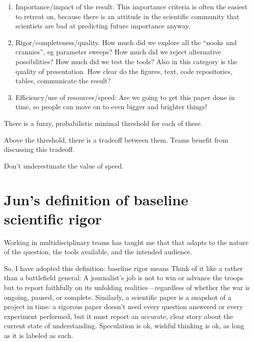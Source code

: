 \documentclass[letterpaper,10pt,english]{sphinxmanual}
\let\sphinxpxdimen\pdfpxdimen\else\newdimen\sphinxpxdimen
\begin{document}
\noindent\sphinxincludegraphics[width=400\sphinxpxdimen]{{fig3way_2}.pdf}
\begin{enumerate}
%
\item {} 
\sphinxAtStartPar
Importance/impact of the result: This importance criteria is often the easiest to retreat on, because there is an attitude in the scientific community that scientists are bad at predicting future importance anyway.

\item {} 
\sphinxAtStartPar
Rigor/completeness/quality. How much did we explore all the “nooks and crannies”, eg parameter sweeps? How much did we reject alternative possibilities? How much did we test the tools? Also in this category is the quality of presentation. How clear do the figures, text, code repositories, tables, communicate the result?

\item {} 
\sphinxAtStartPar
Efficiency/use of resources/speed: Are we going to get this paper done in time, so people can move on to even bigger and brighter things!

\end{enumerate}

\sphinxAtStartPar
There is a fuzzy, probabilistic minimal threshold for each of these.

\sphinxAtStartPar
Above the threshold, there is a trade\sphinxhyphen{}off between them. Teams benefit from discussing this trade\sphinxhyphen{}off.

\sphinxAtStartPar
Don’t underestimate the value of speed.


\section{Jun’s definition of baseline scientific rigor}
\label{\detokenize{02Elements:jun-s-definition-of-baseline-scientific-rigor}}
\sphinxAtStartPar
Working in multidisciplinary teams has taught me that  that adapts to the nature of the question, the tools available, and the intended audience.

\sphinxAtStartPar
So, I have adopted this definition: baseline rigor means 
Think of it like a  rather than a battlefield general:
A journalist’s job is not to win or advance the troops but to report faithfully on its unfolding realities—regardless of whether the war is ongoing, paused, or complete. Similarly, a scientific paper is a snapshot of a project in time: a rigorous paper doesn’t need every question answered or every experiment performed, but it must report an accurate, clear story about the current state of understanding.
Speculation is ok, wishful thinking is ok, as long as it is labeled as such.
\end{document}
